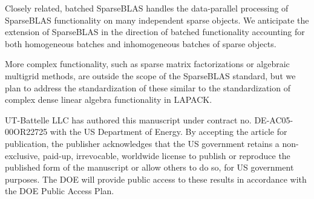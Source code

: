 \documentclass[manuscript,review]{acmart}
\begin{document}
Closely related, batched SparseBLAS handles the data-parallel processing of SparseBLAS functionality on many independent sparse objects. We anticipate the extension of SparseBLAS in the direction of batched functionality accounting for both homogeneous batches and inhomogeneous batches of sparse objects.

More complex functionality, such as sparse matrix factorizations or algebraic multigrid methods, are outside the scope of the SparseBLAS standard, but we plan to address the standardization of these similar to the standardization of complex dense linear algebra functionality in LAPACK.

\begin{acks}
UT-Battelle LLC has authored this manuscript under contract no. DE-AC05-00OR22725 with the US Department of Energy. By accepting the article for publication, the publisher acknowledges that the US government retains a non-exclusive, paid-up, irrevocable, worldwide license to publish or reproduce the published form of the manuscript or allow others to do so, for US government purposes. The DOE will provide public access to these results in accordance with the DOE Public Access Plan.
\end{acks}




%

\end{document}
